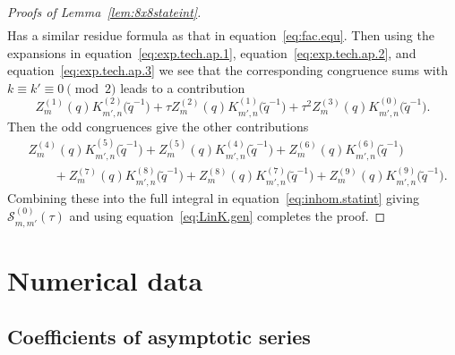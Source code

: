 \documentclass[pdftex]{sigma}
\numberwithin{equation}{section}
\def\tq{\tilde{q}}
\def\calS{\mathcal S}
\def\tq{\tilde{q}}
\begin{document}
\begin{proof}[Proofs of Lemma~\ref{lem:8x8stateint}]
\begin{align*}
\end{align*}
Has a similar residue formula as that in equation~\eqref{eq:fac.equ}. Then using the expansions in equation~\eqref{eq:exp.tech.ap.1}, equation~\eqref{eq:exp.tech.ap.2}, and equation~\eqref{eq:exp.tech.ap.3} we see that the corresponding congruence sums with $k\equiv k'\equiv0\pmod{2}$ leads to a contribution
\[
 Z_{m}^{(1)}(q)K_{m',n}^{(2)}\bigl(\tq^{-1}\bigr)+\tau Z_{m}^{(2)}(q)K_{m',n}^{(1)}\bigl(\tq^{-1}\bigr)+\tau^2 Z_{m}^{(3)}(q)K_{m',n}^{(0)}\bigl(\tq^{-1}\bigr) .
\]
Then the odd congruences give the other contributions
\[
\begin{aligned}
&Z_{m}^{(4)}(q)K_{m',n}^{(5)}\bigl(\tq^{-1}\bigr)+Z_{m}^{(5)}(q)K_{m',n}^{(4)}\bigl(\tq^{-1}\bigr)+Z_{m}^{(6)}(q)K_{m',n}^{(6)}\bigl(\tq^{-1}\bigr)\\
&\qquad{}+Z_{m}^{(7)}(q)K_{m',n}^{(8)}\bigl(\tq^{-1}\bigr)+Z_{m}^{(8)}(q)K_{m',n}^{(7)}\bigl(\tq^{-1}\bigr)+Z_{m}^{(9)}(q)K_{m',n}^{(9)}\bigl(\tq^{-1}\bigr) .
\end{aligned}
\]
Combining these into the full integral in equation~\eqref{eq:inhom.statint} giving $\calS^{(0)}_{m,m'}(\tau)$ and using equation~\eqref{eq:LinK.gen} completes the proof.
\end{proof}

\section{Numerical data}\label{app:numerical}

\subsection{Coefficients of asymptotic series}
\end{document}
